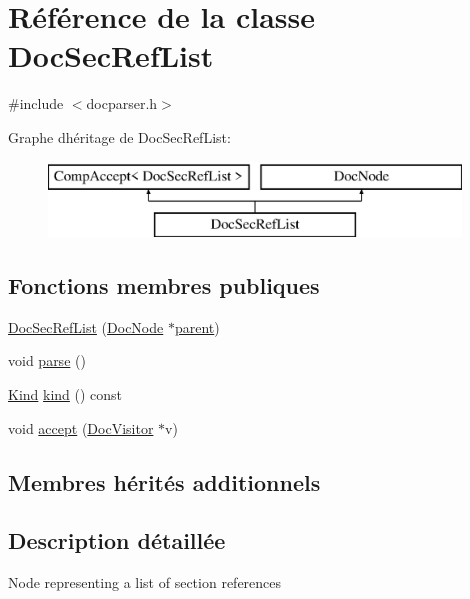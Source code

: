 \hypertarget{class_doc_sec_ref_list}{}\section{Référence de la classe Doc\+Sec\+Ref\+List}
\label{class_doc_sec_ref_list}


{\ttfamily \#include $<$docparser.\+h$>$}

Graphe d\textquotesingle{}héritage de Doc\+Sec\+Ref\+List\+:\begin{figure}[H]
\begin{center}
\leavevmode
\includegraphics[height=2.000000cm]{class_doc_sec_ref_list}
\end{center}
\end{figure}
\subsection*{Fonctions membres publiques}
\begin{DoxyCompactItemize}
\item 
\hyperlink{class_doc_sec_ref_list_af9cf9fe003005fd779fd263ab157f917}{Doc\+Sec\+Ref\+List} (\hyperlink{class_doc_node}{Doc\+Node} $\ast$\hyperlink{class_doc_node_a990d8b983962776a647e6231d38bd329}{parent})
\item 
void \hyperlink{class_doc_sec_ref_list_a9b279250711bb61d12bff4c34e70d2f3}{parse} ()
\item 
\hyperlink{class_doc_node_aebd16e89ca590d84cbd40543ea5faadb}{Kind} \hyperlink{class_doc_sec_ref_list_a6fb709a2a9f41dbe22d72ba38c6628c8}{kind} () const 
\item 
void \hyperlink{class_doc_sec_ref_list_a9d3f6c837060c798649e068bbf3282c1}{accept} (\hyperlink{class_doc_visitor}{Doc\+Visitor} $\ast$v)
\end{DoxyCompactItemize}
\subsection*{Membres hérités additionnels}


\subsection{Description détaillée}
Node representing a list of section references 

